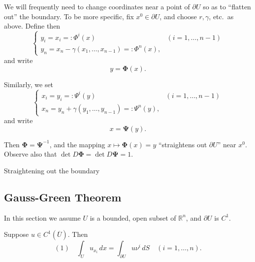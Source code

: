We will frequently need to change coordinates near a point of $\partial U$ so as to ``flatten out'' the boundary. To be more specific, fix $x^0 \in \partial U$, and choose $r, \gamma$, etc.\ as above. Define then
$$\begin{cases} y_i = x_i =: \Phi^i(x) & (i = 1, \ldots, n-1) \\ y_n = x_n - \gamma(x_1, \ldots, x_{n-1}) =: \Phi^n(x), \end{cases}$$
and write
$$y = \mathbf{\Phi}(x).$$

Similarly, we set
$$\begin{cases} x_i = y_i =: \Psi^i(y) & (i = 1, \ldots, n-1) \\ x_n = y_n + \gamma(y_1, \ldots, y_{n-1}) =: \Psi^n(y), \end{cases}$$
and write
$$x = \mathbf{\Psi}(y).$$

Then $\mathbf{\Phi} = \mathbf{\Psi}^{-1}$, and the mapping $x \mapsto \mathbf{\Phi}(x) = y$ ``straightens out $\partial U$'' near $x^0$. Observe also that $\det D\mathbf{\Phi} = \det D\mathbf{\Psi} = 1$.

\begin{figure}[h]\centering
\end{figure}

Straightening out the boundary

\subsection{Gauss-Green Theorem}

In this section we assume $U$ is a bounded, open subset of $\mathbb{R}^n$, and $\partial U$ is $C^1$.

\begin{theorem}
\label{thm:gauss-green-theorem}
Suppose $u \in C^1(\overline{U})$. Then
$$(1) \quad \int_U u_{x_i} \, dx = \int_{\partial U} u \nu^i \, dS \quad (i = 1, \ldots, n).$$
\end{theorem}

